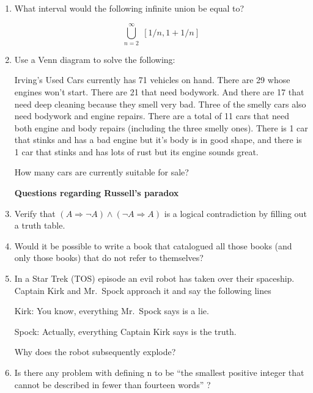 \documentclass{amsart}
\begin{document}
\begin{enumerate}
\item What interval would the following infinite union be equal to?

\[ \bigcup_{n=2}^\infty \; \left[ 1/n, 1 + 1/n \right] \]

\vfill

\newpage

\item Use a Venn diagram to solve the following:

Irving’s Used Cars currently has 71 vehicles on hand.  There are
29 whose engines won’t start.  There are 21 that need bodywork.
And there are 17 that need deep cleaning because they smell very
bad.  Three of the smelly cars also need bodywork and engine
repairs.  There are a total of 11 cars that need both engine and
body repairs (including the three smelly ones).  There is 1 car that
stinks and has a bad engine but it’s body is in good shape, and
there is 1 car that stinks and has lots of rust but its engine sounds
great.

How many cars are currently suitable for sale?

\vfill

\newpage

{\bf \large Questions regarding Russell's paradox}
\bigskip

\item Verify that $(A \Longrightarrow \lnot A) \wedge (\lnot A \Longrightarrow A)$ is a logical contradiction
by filling out a truth table.

\vfill

\item Would it be possible to write a book that catalogued all those books
(and only those books) that do not refer to themselves?

\vfill

\newpage

\item In a Star Trek (TOS) episode an evil robot has taken over their
spaceship.  Captain Kirk and Mr.\ Spock approach it and say the
following lines

Kirk: You know, everything Mr.\ Spock says is a lie.

Spock: Actually, everything Captain Kirk says is the truth.

Why does the robot subsequently explode?

\vfill

\item Is there any problem with defining n to be “the smallest positive
integer that cannot be described in fewer than fourteen words” ?


\end{enumerate}
\end{document}
